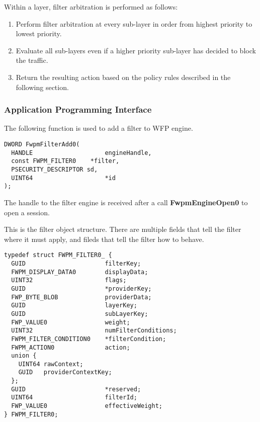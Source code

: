 \vspace{5mm}
Within a layer, filter arbitration is performed as follows:
\vspace{5mm}

\begin{enumerate}
\item Perform filter arbitration at every sub-layer in order from highest priority to lowest priority.
\item Evaluate all sub-layers even if a higher priority sub-layer has decided to block the traffic.
\item Return the resulting action based on the policy rules described in the following section.
\end{enumerate}

\vspace{5mm}

\subsubsection{Application Programming Interface}

The following function is used to add a filter to WFP engine.

\begin{lstlisting}
DWORD FwpmFilterAdd0(
  HANDLE               		engineHandle,
  const FWPM_FILTER0   	*filter,
  PSECURITY_DESCRIPTOR sd,
  UINT64               		*id
);
\end{lstlisting}

The handle to the filter engine is received after a call \textbf{FwpmEngineOpen0} to open a session.

This is the filter object structure. There are multiple fields that tell the filter where it must apply, and fileds that tell the filter how to behave.

\begin{lstlisting}
typedef struct FWPM_FILTER0_ {
  GUID                   	filterKey;
  FWPM_DISPLAY_DATA0     	displayData;
  UINT32                 	flags;
  GUID                   	*providerKey;
  FWP_BYTE_BLOB          	providerData;
  GUID                   	layerKey;
  GUID                   	subLayerKey;
  FWP_VALUE0                weight;
  UINT32                 	numFilterConditions;
  FWPM_FILTER_CONDITION0 	*filterCondition;
  FWPM_ACTION0              action;
  union {
    UINT64 rawContext;
    GUID   providerContextKey;
  };
  GUID                   	*reserved;
  UINT64                 	filterId;
  FWP_VALUE0             	effectiveWeight;
} FWPM_FILTER0;
\end{lstlisting}

